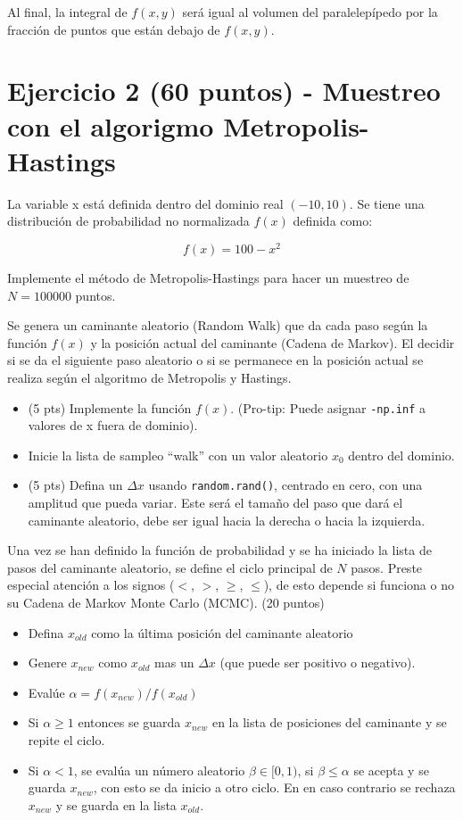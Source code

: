 \documentclass{article}
\begin{document}
Al final, la integral de $f(x,y)$ será igual al volumen del paralelepípedo por la fracción
de puntos que están debajo de $f(x,y)$.


\section{Ejercicio 2 (60 puntos) - Muestreo con el algorigmo Metropolis-Hastings}

La variable x está definida dentro del dominio real $(-10,10)$.
Se tiene una distribución de probabilidad no normalizada $f(x)$ definida como:

\begin{equation}
  f(x) = 100 - x^2
\end{equation}

Implemente el método de Metropolis-Hastings para hacer un muestreo de $N=100000$ puntos.

Se genera un caminante aleatorio (Random Walk) que da cada paso según la función $f(x)$ y la posición
actual del caminante (Cadena de Markov). El decidir si se da el siguiente paso aleatorio
o si se permanece en la posición actual se realiza según el algoritmo de Metropolis y Hastings. 


\begin{itemize}
\item (5 pts) Implemente la función $f(x)$. (Pro-tip: Puede asignar \texttt{-np.inf} a valores
  de x fuera de dominio).
\item Inicie la lista de sampleo ``walk'' con un valor aleatorio $x_0$ dentro del dominio.
\item (5 pts) Defina un $\Delta x$ usando \texttt{random.rand()}, centrado en cero, con una amplitud
  que pueda variar. Este será el tamaño del paso que dará el caminante aleatorio, debe ser
  igual hacia la derecha o hacia la izquierda.
\end{itemize}

Una vez se han definido la función de probabilidad y se ha iniciado la lista de pasos del
caminante aleatorio, se define el ciclo principal de $N$ pasos. Preste especial atención a
los signos ($<$, $>$, $\geq$, $\leq$), de esto depende si funciona o no su Cadena de Markov
Monte Carlo (MCMC). (20 puntos)
\begin{itemize}
\item Defina $x_{old}$ como la última posición del caminante aleatorio
\item Genere $x_{new}$ como $x_{old}$ mas un $\Delta x$ (que puede ser positivo o negativo).
\item Evalúe $\alpha = f(x_{new}) / f(x_{old})$
\item Si $\alpha \geq 1$ entonces se guarda $x_{new}$ en la lista de posiciones del caminante y se repite el ciclo.
\item Si $\alpha<1$, se evalúa un número aleatorio $\beta \in [0,1)$, si $\beta \leq \alpha$ se acepta y se guarda
  $x_{new}$, con esto se da inicio a otro ciclo. En en caso contrario se rechaza $x_{new}$ y se guarda en la lista $x_{old}$.
\end{itemize}
\end{document}
